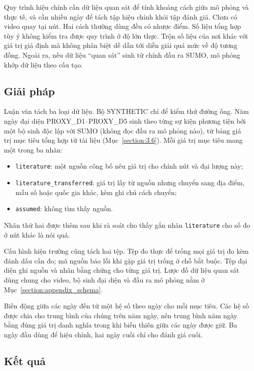 \documentclass[../DoAn.tex]{subfiles}
\begin{document}
Quy trình hiệu chỉnh cần dữ liệu quan sát để tính khoảng cách giữa mô phỏng và thực tế, và cần nhiều ngày để tách tập hiệu chỉnh khỏi tập đánh giá. Chưa có video quay tại nút. Hai cách thường dùng đều có nhược điểm. Số liệu tổng hợp tùy ý không kiểm tra được quy trình ở độ lớn thực. Trộn số liệu của nơi khác với giá trị giả định mà không phân biệt dễ dẫn tới diễn giải quá mức về độ tương đồng. Ngoài ra, nếu dữ liệu ``quan sát'' sinh từ chính đầu ra SUMO, mô phỏng khớp dữ liệu theo cấu tạo.

\subsection{Giải pháp}

Luận văn tách ba loại dữ liệu. Bộ SYNTHETIC chỉ để kiểm thử đường ống. Năm ngày đại diện PROXY\_D1--PROXY\_D5 sinh theo từng sự kiện phương tiện bởi một bộ sinh độc lập với SUMO (không đọc đầu ra mô phỏng nào), từ bảng giá trị mục tiêu tổng hợp từ tài liệu (Mục~\ref{section:3.6}). Mỗi giá trị mục tiêu mang một trong ba nhãn:
\begin{itemize}
    \item \texttt{literature}: một nguồn công bố nêu giá trị cho chính nút và đại lượng này;
    \item \texttt{literature\_transferred}: giá trị lấy từ nguồn nhưng chuyển sang địa điểm, mẫu số hoặc quốc gia khác, kèm ghi chú cách chuyển;
    \item \texttt{assumed}: không tìm thấy nguồn.
\end{itemize}
Nhãn thứ hai được thêm sau khi rà soát cho thấy gắn nhãn \texttt{literature} cho số đo ở nút khác là nói quá.

Cấu hình hiện trường cũng tách hai tệp. Tệp đo thực để trống mọi giá trị đo kèm đánh dấu cần đo; mã nguồn báo lỗi khi gặp giá trị trống ở chỗ bắt buộc. Tệp đại diện ghi nguồn và nhãn bằng chứng cho từng giá trị. Lược đồ dữ liệu quan sát dùng chung cho video, bộ sinh đại diện và đầu ra mô phỏng nằm ở Mục~\ref{section:appendix_schema}.

Biến động giữa các ngày đến từ một hệ số theo ngày cho mỗi mục tiêu. Các hệ số được chia cho trung bình của chúng trên năm ngày, nên trung bình năm ngày bằng đúng giá trị danh nghĩa trong khi biến thiên giữa các ngày được giữ. Ba ngày đầu dùng để hiệu chỉnh, hai ngày cuối chỉ cho đánh giá cuối.

\subsection{Kết quả}
\end{document}
